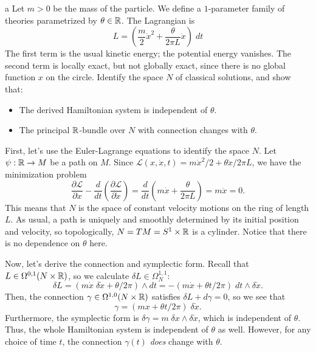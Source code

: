 \documentclass{pset}
\theoremstyle{plain}
\begin{document}
\begin{parts}
  \begin{part}{a}
    Let $m>0$ be the mass of the particle. We define a $1$-parameter family of theories parametrized by $\theta\in \mathbb{R}$. The Lagrangian is
    \[
      L = \left(\frac{m}{2}\dot{x}^2+\frac{\theta}{2\pi L}\dot{x}\right)\;dt
    \]
    The first term is the usual kinetic energy; the potential energy vanishes. The second term is locally exact, but not globally exact, since there is no global function $x$ on the circle. Identify the space $N$ of classical solutions, and show that:
    \begin{itemize}
      \item The derived Hamiltonian system is independent of $\theta$.
      \item The principal $\mathbb{R}$-bundle over $N$ with connection changes with $\theta$.
    \end{itemize}
  \end{part}

  First, let's use the Euler-Lagrange equations to identify the space $N$. Let $\psi : \mathbb{R} \to M$ be a path on $M$. Since $\mathcal{L}(x,\dot{x}, t) = m\dot{x}^2/2+\theta \dot{x}/2\pi L$, we have the minimization problem
  \[\frac{\partial \mathcal{L}}{\partial x}-\frac{d}{dt}\left(\frac{\partial \mathcal{L}}{\partial \dot{x}}\right) = \frac{d}{dt}\left(m\dot{x}+\frac{\theta}{2\pi L}\right) =m\ddot{x}= 0.\]
  This means that $N$ is the space of constant velocity motions on the ring of length $L$. As usual, a path is uniquely and smoothly determined by its initial position and velocity, so topologically, $N = TM = S^1\times \mathbb{R}$ is a cylinder. Notice that there is no dependence on $\theta$ here.

  Now, let's derive the connection and symplectic form. Recall that $L\in \Omega^{0,1}(N\times \mathbb{R})$, so we calculate $\delta L\in \Omega^{1,1}_N$:
  \[\delta L = \left(m\dot{x}\;\delta \dot{x} + \theta / 2\pi \right)\wedge dt = -(m\dot{x} + \theta t/2\pi)\;dt\wedge \delta\dot{x}.\]
  Then, the connection $\gamma\in \Omega^{1,0}(N\times \mathbb{R})$ satisfies $\delta L+d\gamma = 0$, so we see that
  \[\gamma = (mx+\theta t/2\pi)\;\delta\dot{x}.\]
  Furthermore, the symplectic form is $\delta \gamma = m\;\delta x\wedge \delta\dot{x}$, which is independent of $\theta$. Thus, the whole Hamiltonian system is independent of $\theta$ as well. However, for any choice of time $t$, the connection $\gamma(t)$ \emph{does} change with $\theta$.


\end{parts}
\end{document}
